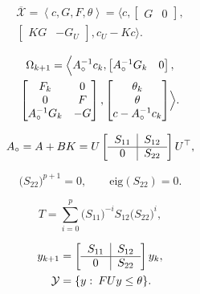 \documentclass[10pt,a4paper]{amsart}
\newcommand{\bbm}{\begin{bmatrix}}
\newcommand{\ebm}{\end{bmatrix}}
\begin{document}
\begin{multline}
\label{eq:x_constr_zon}
\overline{\mathcal X} = \left\langle c, G, F, \theta\right\rangle =\bigl\langle c, \bbm G& 0\ebm,\\ \bbm KG& -G_U\ebm, c_U-Kc\bigr\rangle.
\end{multline}

\begin{multline}
\label{eq:mpi_constr_zon}
\Omega_{k+1} =\Bigl\langle A_\circ^{-1}c_k, \bbm A_\circ^{-1}G_k& 0\ebm,\\
    \bbm F_k&0\\ 0& F\\ A_\circ^{-1}G_k& -G\ebm,  \bbm\theta_k\\\theta\\c-A_\circ^{-1}c_k\ebm\Bigr\rangle.
\end{multline}

\begin{equation}
\label{eq:schur}
    A_\circ=A+BK = U\left[\begin{tabular}{c|c}
         $S_{11}$& $S_{12}$ \\\hline
         0& $S_{22}$
    \end{tabular}\right]U^\top, 
\end{equation}

\begin{equation}
\label{eq:nilpotent}
    \bigl(S_{22}\bigr)^{p+1} = 0, \qquad \text{eig}(S_{22}) = 0.
\end{equation}

\begin{equation}
    \label{eq:T}
    T=\sum_{i=0}^{p} \bigl(S_{11}\bigr)^{-i}S_{12}\bigl(S_{22}\bigr)^{i},
\end{equation}

\begin{align}
    \label{eq:y_dynamics}
    y_{k+1}&=\left[\begin{tabular}{c|c}
         $S_{11}$& $S_{12}$ \\\hline
         0& $S_{22}$
    \end{tabular}\right]y_k, \\
    \label{eq:y_set}\mathcal Y &= \{y:\: FUy\leq \theta\}.
\end{align}
\end{document}
